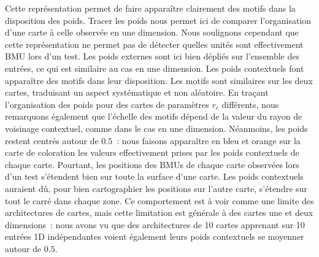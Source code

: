 \documentclass[../main]{subfiles}
\begin{document}
Cette représentation permet de faire apparaître clairement des motifs dans la disposition des poids.
Tracer les poids nous permet ici de comparer l'organisation d'une carte à celle observée en une dimension. Nous soulignons cependant que cette représentation ne permet pas de détecter quelles unités sont effectivement BMU lors d'un test.
Les poids externes sont ici bien dépliés sur l'ensemble des entrées, ce qui est similaire au cas en une dimension.
Les poids contextuels font apparaître des motifs dans leur disposition. 
Les motifs sont similaires sur les deux cartes, traduisant un aspect systématique et non aléatoire.
En traçant l'organisation des poids pour des cartes de paramètres $r_c$ différents, nous remarquons également que l'échelle des motifs dépend de la valeur du rayon de voisinage contextuel, comme dans le cas en une dimension.
Néanmoins, les poids restent centrés autour de $0.5$~: nous faisons apparaître en bleu et orange sur la carte de coloration les valeurs effectivement prises par les poids contextuels de chaque carte. 
Pourtant, les positions des BMUs de chaque carte observées lors d'un test s'étendent bien sur toute la surface d'une carte. Les poids contextuels auraient dû, pour bien cartographier les positions sur l'autre carte, s'étendre sur tout le carré dans chaque zone.
Ce comportement est à voir comme une limite des architectures de cartes, mais cette limitation est générale à des cartes une et deux dimensions~:  nous avons vu que des architectures de 10 cartes apprenant sur 10 entrées 1D indépendantes voient également leurs poids contextuels se moyenner autour de $0.5$.
\end{document}
